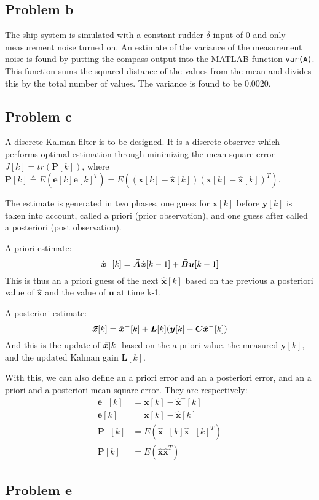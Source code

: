 \subsection{Problem b}
The ship system is simulated with a constant rudder $\delta$-input of 0 and only measurement noise turned on. An estimate of the variance of 
the measurement noise is found by putting the compass output into the MATLAB function {\texttt{var(A)}}. This function sums the squared distance of the values from the mean and divides this by the total number of values. The variance 
is found to be 0.0020.

\subsection{Problem c}
A discrete Kalman filter is to be designed. It is a discrete observer which performs optimal estimation through minimizing the mean-square-error $J[k] = tr(\bm{P}[k])$, where
$\bm{P}[k] \triangleq E(\bm{e}[k]\bm{e}[k]^T) = E((\bm{x}[k] - \hat{\bm{x}}[k])(\bm{x}[k] - \hat{\bm{x}}[k])^T)$.

The estimate is generated in two phases, one guess for $\bm{x}[k]$ before $\bm{y}[k]$ is taken into account, called a priori (prior observation), and one guess after called a posteriori (post observation).

A priori estimate:
\begin{equation}
\hat{\bm{x}}^-[k] = \thickbar{\bm{A}}\hat{\bm{x}}[k-1]+\thickbar{\bm{B}}\bm{u}[k-1]
\end{equation}
This is thus an a priori guess of the next $\hat{\bm{x}}[k]$ based on the previous a posteriori value of $\hat{\bm{x}}$ and the value of $\bm{u}$ at time k-1.

A posteriori estimate:
\begin{equation}
\thickbar{\bm{x}}[k] = \hat{\bm{x}}^-[k] + \bm{L}[k](\bm{y}[k] - \bm{C}\hat{\bm{x}}^-[k])
\end{equation}
And this is the update of $\thickbar{\bm{x}}[k]$ based on the a priori value, the measured $\bm{y}[k]$, and the updated Kalman gain $\bm{L}[k]$.

With this, we can also define an a priori error and an a posteriori error, and an a priori and a posteriori mean-square error. They are respectively:
\begin{align}
\bm{e}^-[k] &= \bm{x}[k] - \hat{\bm{x}}^-[k] \\
\bm{e}[k] &= \bm{x}[k] - \hat{\bm{x}}[k] \\
\bm{P}^-[k] &= E(\hat{\bm{x}}^-[k]\hat{\bm{x}}^-[k]^T) \\
\bm{P}[k] &= E(\hat{\bm{x}}\hat{\bm{x}}^T)
\end{align}



\subsection{Problem e}
